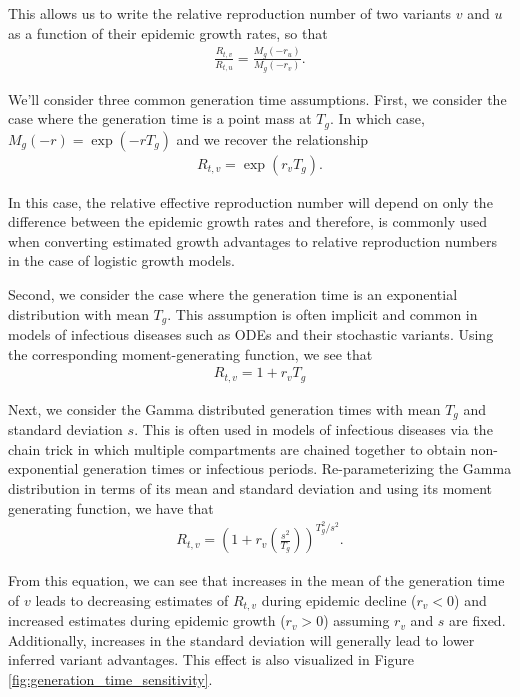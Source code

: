 This allows us to write the relative reproduction number of two variants $v$ and $u$ as a function of their epidemic growth rates, so that
\begin{align*}
\frac{R_{t,v}}{R_{t,u}} = \frac{M_{g}(-r_{u})}{M_{g}(-r_{v})}.
\end{align*}

We'll consider three common generation time assumptions. First, we consider the case where the generation time is a point mass at $T_{g}$. In which case, $M_{g}(-r) = \exp(-r T_{g})$ and we recover the relationship
\begin{align*}
R_{t,v} = \exp(r_{v}T_{g}).
\end{align*}

In this case, the relative effective reproduction number will depend on only the difference between the epidemic growth rates and therefore, is commonly used when converting estimated growth advantages to relative reproduction numbers in the case of logistic growth models.

Second, we consider the case where the generation time is an exponential distribution with mean $T_{g}$. This assumption is often implicit and common in models of infectious diseases such as ODEs and their stochastic variants. Using the corresponding moment-generating function, we see that
\begin{align*}
R_{t,v} = 1 + r_{v} T_{g}
\end{align*}

Next, we consider the Gamma distributed generation times with mean $T_{g}$ and standard deviation $s$.
This is often used in models of infectious diseases via the chain trick in which multiple compartments are chained together to obtain non-exponential generation times or infectious periods.
Re-parameterizing the Gamma distribution in terms of its mean and standard deviation and using its moment generating function, we have that
\begin{align*}
R_{t,v} = \left(1 + r_{v}  \left(\frac{s^{2}}{T_{g}}\right) \right)^{T_{g}^{2} / s^{2}}.
\end{align*}

From this equation, we can see that increases in the mean of the generation time of $v$ leads to decreasing estimates of $R_{t,v}$ during epidemic decline ($r_{v} < 0$) and increased estimates during epidemic growth ($r_{v} > 0$) assuming $r_{v}$ and $s$ are fixed.
Additionally, increases in the standard deviation will generally lead to lower inferred variant advantages.
This effect is also visualized in Figure \ref{fig:generation_time_sensitivity}.

